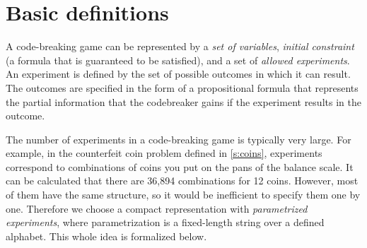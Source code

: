 \section{Basic definitions}

A code-breaking game can be represented by a \emph{set of variables},
  \emph{initial constraint} (a formula that is guaranteed to be satisfied),
  and a set of \emph{allowed experiments}.
An experiment is defined by the set of possible outcomes in which it can result.
The outcomes are specified in the form of a propositional formula that
  represents the partial information
  that the codebreaker gains if the experiment results in the outcome.

The number of experiments in a code-breaking game is typically very large.
For example, in the counterfeit coin problem defined in \autoref{s:coins},
  experiments correspond to combinations of coins you put on the pans of the
  balance scale.
It can be calculated that there are 36,894 combinations for 12 coins.
However, most of them have the same structure,
  so it would be inefficient to specify them one by one.
Therefore we choose a compact representation with \emph{parametrized experiments},
  where parametrization is a fixed-length string over a defined alphabet.
This whole idea is formalized below.

